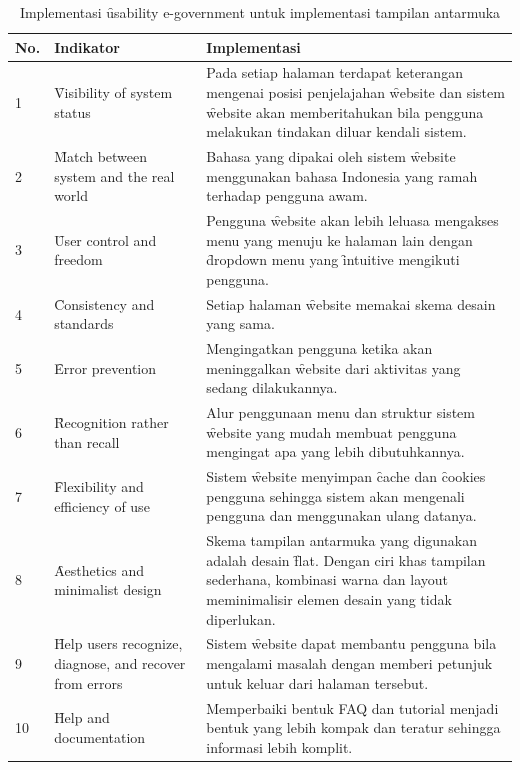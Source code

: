 \begin{center}
	\begin{longtable}{|p{0.5cm}|p{4.5cm}|p{6.5cm}|}
		\caption{Implementasi \f{usability e-government} untuk implementasi tampilan antarmuka}
		\label{tab:strategi}\\
		\hline
		\textbf{No.} & \textbf{Indikator} & \textbf{Implementasi} \\ \hline \endhead
		1 & \f{Visibility of system status} & Pada setiap halaman terdapat keterangan mengenai posisi penjelajahan \f{website} dan sistem \f{website} akan memberitahukan bila pengguna melakukan tindakan diluar kendali sistem. \\ \hline
		2 & \f{Match between system and the real world} & Bahasa yang dipakai oleh sistem \f{website} menggunakan bahasa Indonesia yang ramah terhadap pengguna awam. \\ \hline
		3 & \f{User control and freedom} & Pengguna \f{website} akan lebih leluasa mengakses menu yang menuju ke halaman lain dengan \f{dropdown} menu yang \f{intuitive} mengikuti pengguna. \\ \hline
		4 & \f{Consistency and standards} & Setiap halaman \f{website} memakai skema desain yang sama. \\ \hline
		5 & \f{Error prevention} & Mengingatkan pengguna ketika akan meninggalkan \f{website} dari aktivitas yang sedang dilakukannya. \\ \hline
		6 & \f{Recognition rather than recall} & Alur penggunaan menu dan struktur sistem \f{website} yang mudah membuat pengguna mengingat apa yang lebih dibutuhkannya. \\ \hline
		7 & \f{Flexibility and efficiency of use }& Sistem \f{website} menyimpan \f{cache} dan \f{cookies} pengguna sehingga sistem akan mengenali pengguna dan menggunakan ulang datanya. \\ \hline
		8 & \f{Aesthetics and minimalist design} & Skema tampilan antarmuka yang digunakan adalah desain \f{flat}. Dengan ciri khas tampilan sederhana, kombinasi warna dan layout meminimalisir elemen desain yang tidak diperlukan. \\ \hline
		9 & \f{Help users recognize, diagnose, and recover from errors} & Sistem \f{website} dapat membantu pengguna bila mengalami masalah dengan memberi petunjuk untuk keluar dari halaman tersebut. \\ \hline
		10 & \f{Help and documentation} & Memperbaiki bentuk FAQ dan tutorial menjadi bentuk yang lebih kompak dan teratur sehingga informasi lebih komplit. \\ \hline

\end{longtable}
\end{center}
